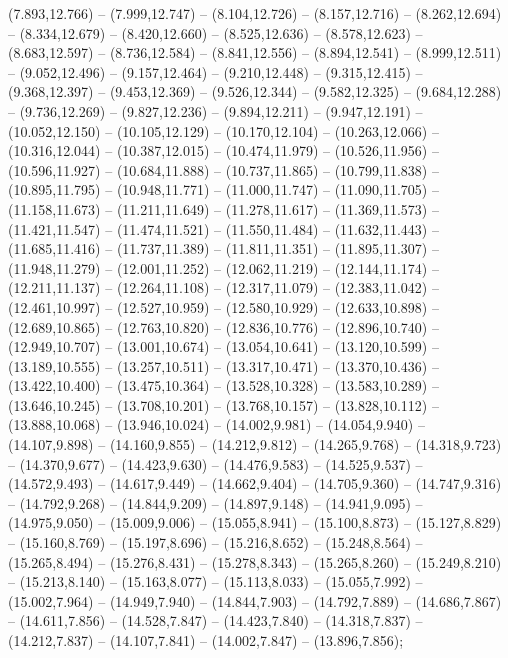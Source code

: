 (7.893,12.766) -- (7.999,12.747) -- (8.104,12.726) -- (8.157,12.716) -- (8.262,12.694) -- (8.334,12.679) -- (8.420,12.660) -- (8.525,12.636) -- (8.578,12.623) -- (8.683,12.597) -- (8.736,12.584) -- (8.841,12.556) -- (8.894,12.541) -- (8.999,12.511) -- (9.052,12.496) -- (9.157,12.464) -- (9.210,12.448) -- (9.315,12.415) -- (9.368,12.397) -- (9.453,12.369) -- (9.526,12.344) -- (9.582,12.325) -- (9.684,12.288) -- (9.736,12.269) -- (9.827,12.236) -- (9.894,12.211) -- (9.947,12.191) -- (10.052,12.150) -- (10.105,12.129) -- (10.170,12.104) -- (10.263,12.066) -- (10.316,12.044) -- (10.387,12.015) -- (10.474,11.979) -- (10.526,11.956) -- (10.596,11.927) -- (10.684,11.888) -- (10.737,11.865) -- (10.799,11.838) -- (10.895,11.795) -- (10.948,11.771) -- (11.000,11.747) -- (11.090,11.705) -- (11.158,11.673) -- (11.211,11.649) -- (11.278,11.617) -- (11.369,11.573) -- (11.421,11.547) -- (11.474,11.521) -- (11.550,11.484) -- (11.632,11.443) -- (11.685,11.416) -- (11.737,11.389) -- (11.811,11.351) -- (11.895,11.307) -- (11.948,11.279) -- (12.001,11.252) -- (12.062,11.219) -- (12.144,11.174) -- (12.211,11.137) -- (12.264,11.108) -- (12.317,11.079) -- (12.383,11.042) -- (12.461,10.997) -- (12.527,10.959) -- (12.580,10.929) -- (12.633,10.898) -- (12.689,10.865) -- (12.763,10.820) -- (12.836,10.776) -- (12.896,10.740) -- (12.949,10.707) -- (13.001,10.674) -- (13.054,10.641) -- (13.120,10.599) -- (13.189,10.555) -- (13.257,10.511) -- (13.317,10.471) -- (13.370,10.436) -- (13.422,10.400) -- (13.475,10.364) -- (13.528,10.328) -- (13.583,10.289) -- (13.646,10.245) -- (13.708,10.201) -- (13.768,10.157) -- (13.828,10.112) -- (13.888,10.068) -- (13.946,10.024) -- (14.002,9.981) -- (14.054,9.940) -- (14.107,9.898) -- (14.160,9.855) -- (14.212,9.812) -- (14.265,9.768) -- (14.318,9.723) -- (14.370,9.677) -- (14.423,9.630) -- (14.476,9.583) -- (14.525,9.537) -- (14.572,9.493) -- (14.617,9.449) -- (14.662,9.404) -- (14.705,9.360) -- (14.747,9.316) -- (14.792,9.268) -- (14.844,9.209) -- (14.897,9.148) -- (14.941,9.095) -- (14.975,9.050) -- (15.009,9.006) -- (15.055,8.941) -- (15.100,8.873) -- (15.127,8.829) -- (15.160,8.769) -- (15.197,8.696) -- (15.216,8.652) -- (15.248,8.564) -- (15.265,8.494) -- (15.276,8.431) -- (15.278,8.343) -- (15.265,8.260) -- (15.249,8.210) -- (15.213,8.140) -- (15.163,8.077) -- (15.113,8.033) -- (15.055,7.992) -- (15.002,7.964) -- (14.949,7.940) -- (14.844,7.903) -- (14.792,7.889) -- (14.686,7.867) -- (14.611,7.856) -- (14.528,7.847) -- (14.423,7.840) -- (14.318,7.837) -- (14.212,7.837) -- (14.107,7.841) -- (14.002,7.847) -- (13.896,7.856);
